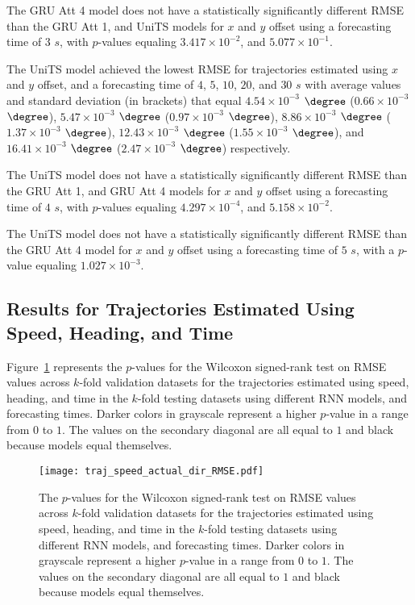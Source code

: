 The GRU Att 4 model does not have a statistically significantly different RMSE than the GRU Att 1, and UniTS models for $x$ and $y$ offset using a forecasting time of $3$ $s$, with $p$-values equaling $3.417 \times 10^{-2}$, and $5.077 \times 10^{-1}$.

The UniTS model achieved the lowest RMSE for trajectories estimated using $x$ and $y$ offset, and a forecasting time of $4$, $5$, $10$, $20$, and $30$ $s$ with average values and standard deviation (in brackets) that equal $4.54 \times 10^{-3}$ $\degree$ ($0.66 \times 10^{-3}$ $\degree$), $5.47 \times 10^{-3}$ $\degree$ ($0.97 \times 10^{-3}$ $\degree$), $8.86 \times 10^{-3}$ $\degree$ ($1.37 \times 10^{-3}$ $\degree$), $12.43 \times 10^{-3}$ $\degree$ ($1.55 \times 10^{-3}$ $\degree$), and $16.41 \times 10^{-3}$ $\degree$ ($2.47 \times 10^{-3}$ $\degree$) respectively.

The UniTS model does not have a statistically significantly different RMSE than the GRU Att 1, and GRU Att 4 models for $x$ and $y$ offset using a forecasting time of $4$ $s$, with $p$-values equaling $4.297 \times 10^{-4}$, and $5.158 \times 10^{-2}$.

The UniTS model does not have a statistically significantly different RMSE than the GRU Att 4 model for $x$ and $y$ offset using a forecasting time of $5$ $s$, with a $p$-value equaling $1.027 \times 10^{-3}$.

\subsection{Results for Trajectories Estimated Using Speed, Heading, and Time}

Figure~\ref{fig:traj_speed_actual_dir_RMSE} represents the $p$-values for the Wilcoxon signed-rank test on RMSE values across $k$-fold validation datasets for the trajectories estimated using speed, heading, and time in the $k$-fold testing datasets using different RNN models, and forecasting times. Darker colors in grayscale represent a higher $p$-value in a range from $0$ to $1$. The values on the secondary diagonal are all equal to $1$ and black because models equal themselves.

\begin{figure}[!ht]
	\centering
	\texttt{[image: traj\_speed\_actual\_dir\_RMSE.pdf]}
	\caption{The $p$-values for the Wilcoxon signed-rank test on RMSE values across $k$-fold validation datasets for the trajectories estimated using speed, heading, and time in the $k$-fold testing datasets using different RNN models, and forecasting times. Darker colors in grayscale represent a higher $p$-value in a range from $0$ to $1$. The values on the secondary diagonal are all equal to $1$ and black because models equal themselves.}
	\label{fig:traj_speed_actual_dir_RMSE}
\end{figure}

